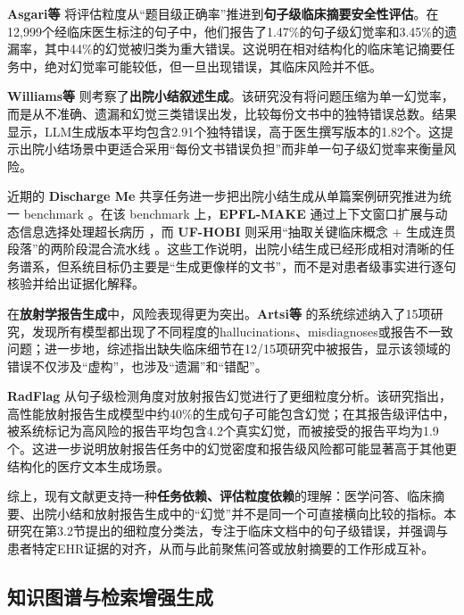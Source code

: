 \documentclass[11pt]{article}
\begin{document}
\textbf{Asgari等} \citep{asgari2025clinicalSafetySummarisation} 将评估粒度从``题目级正确率''推进到\textbf{句子级临床摘要安全性评估}。在12,999个经临床医生标注的句子中，他们报告了1.47\%的句子级幻觉率和3.45\%的遗漏率，其中44\%的幻觉被归类为重大错误。这说明在相对结构化的临床笔记摘要任务中，绝对幻觉率可能较低，但一旦出现错误，其临床风险并不低。

\textbf{Williams等} \citep{williams2025dischargeSummaries} 则考察了\textbf{出院小结叙述生成}。该研究没有将问题压缩为单一幻觉率，而是从不准确、遗漏和幻觉三类错误出发，比较每份文书中的独特错误总数。结果显示，LLM生成版本平均包含2.91个独特错误，高于医生撰写版本的1.82个。这提示出院小结场景中更适合采用``每份文书错误负担''而非单一句子级幻觉率来衡量风险。

近期的 \textbf{Discharge Me} 共享任务进一步把出院小结生成从单篇案例研究推进为统一 benchmark \citep{xu2024dischargeMeSharedTask}。在该 benchmark 上，\textbf{EPFL-MAKE} 通过上下文窗口扩展与动态信息选择处理超长病历 \citep{wu2024epflMakeDischargeMe}，而 \textbf{UF-HOBI} 则采用``抽取关键临床概念 + 生成连贯段落''的两阶段混合流水线 \citep{lyu2024ufHobiDischargeMe}。这些工作说明，出院小结生成已经形成相对清晰的任务谱系，但系统目标仍主要是``生成更像样的文书''，而不是对患者级事实进行逐句核验并给出证据化解释。

在\textbf{放射学报告生成}中，风险表现得更为突出。\textbf{Artsi等} \citep{artsi2025radiologyReview} 的系统综述纳入了15项研究，发现所有模型都出现了不同程度的hallucinations、misdiagnoses或报告不一致问题；进一步地，综述指出缺失临床细节在12/15项研究中被报告，显示该领域的错误不仅涉及``虚构''，也涉及``遗漏''和``错配''。

\textbf{RadFlag} \citep{zhang2024radFlag} 从句子级检测角度对放射报告幻觉进行了更细粒度分析。该研究指出，高性能放射报告生成模型中约40\%的生成句子可能包含幻觉；在其报告级评估中，被系统标记为高风险的报告平均包含4.2个真实幻觉，而被接受的报告平均为1.9个。这进一步说明放射报告任务中的幻觉密度和报告级风险都可能显著高于其他更结构化的医疗文本生成场景。

综上，现有文献更支持一种\textbf{任务依赖、评估粒度依赖}的理解：医学问答、临床摘要、出院小结和放射报告生成中的``幻觉''并不是同一个可直接横向比较的指标。本研究在第3.2节提出的细粒度分类法，专注于临床文档中的句子级错误，并强调与患者特定EHR证据的对齐，从而与此前聚焦问答或放射摘要的工作形成互补。

\subsection{知识图谱与检索增强生成}
\end{document}
